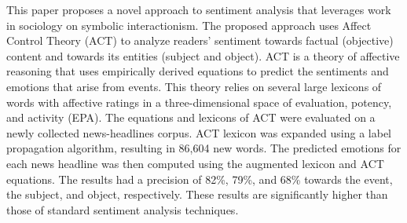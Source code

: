 This paper proposes a novel approach to sentiment analysis that leverages work in sociology on symbolic interactionism. The proposed approach uses Affect Control Theory (ACT) to analyze readers' sentiment towards factual (objective) content and towards its entities (subject and object). ACT is a theory of affective reasoning that uses empirically derived equations to predict the sentiments and emotions that arise from events. This theory relies on several large lexicons of words with affective ratings in a three-dimensional space of evaluation, potency, and activity (EPA). The equations and lexicons of ACT were evaluated on a newly collected news-headlines corpus. ACT lexicon was expanded using a label propagation algorithm, resulting in 86,604 new words. The predicted emotions for each news headline was then computed using the augmented lexicon and ACT equations. The results had a precision of 82\%, 79\%, and 68\% towards the event, the subject, and object, respectively. These results are significantly higher than those of standard sentiment analysis techniques.
